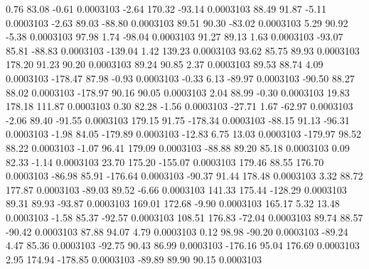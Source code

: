         0.76       83.08       -0.61     0.0003103
       -2.64      170.32      -93.14     0.0003103
       88.49       91.87       -5.11     0.0003103
       -2.63       89.03      -88.80     0.0003103
       89.51       90.30      -83.02     0.0003103
        5.29       90.92       -5.38     0.0003103
       97.98        1.74      -98.04     0.0003103
       91.27       89.13        1.63     0.0003103
      -93.07       85.81      -88.83     0.0003103
     -139.04        1.42      139.23     0.0003103
       93.62       85.75       89.93     0.0003103
      178.20       91.23       90.20     0.0003103
       89.24       90.85        2.37     0.0003103
       89.53       88.74        4.09     0.0003103
     -178.47       87.98       -0.93     0.0003103
       -0.33        6.13      -89.97     0.0003103
      -90.50       88.27       88.02     0.0003103
     -178.97       90.16       90.05     0.0003103
        2.04       88.99       -0.30     0.0003103
       19.83      178.18      111.87     0.0003103
        0.30       82.28       -1.56     0.0003103
      -27.71        1.67      -62.97     0.0003103
       -2.06       89.40      -91.55     0.0003103
      179.15       91.75     -178.34     0.0003103
      -88.15       91.13      -96.31     0.0003103
       -1.98       84.05     -179.89     0.0003103
      -12.83        6.75       13.03     0.0003103
     -179.97       98.52       88.22     0.0003103
       -1.07       96.41      179.09     0.0003103
      -88.88       89.20       85.18     0.0003103
        0.09       82.33       -1.14     0.0003103
       23.70      175.20     -155.07     0.0003103
      179.46       88.55      176.70     0.0003103
      -86.98       85.91     -176.64     0.0003103
      -90.37       91.44      178.48     0.0003103
        3.32       88.72      177.87     0.0003103
      -89.03       89.52       -6.66     0.0003103
      141.33      175.44     -128.29     0.0003103
       89.31       89.93      -93.87     0.0003103
      169.01      172.68       -9.90     0.0003103
      165.17        5.32       13.48     0.0003103
       -1.58       85.37      -92.57     0.0003103
      108.51      176.83      -72.04     0.0003103
       89.74       88.57      -90.42     0.0003103
       87.88       94.07        4.79     0.0003103
        0.12       98.98      -90.20     0.0003103
      -89.24        4.47       85.36     0.0003103
      -92.75       90.43       86.99     0.0003103
     -176.16       95.04      176.69     0.0003103
        2.95      174.94     -178.85     0.0003103
      -89.89       89.90       90.15     0.0003103
